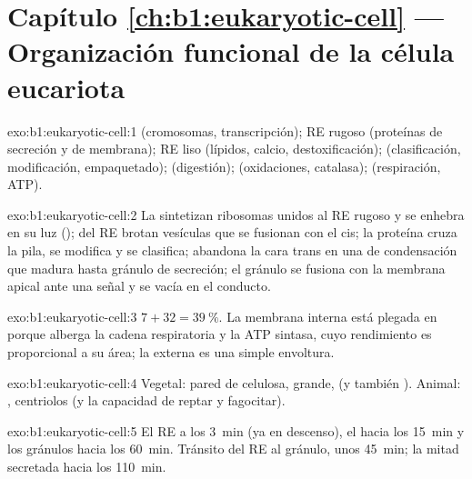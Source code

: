 \section*{Capítulo \ref{ch:b1:eukaryotic-cell} --- Organización funcional de la célula eucariota}

\begin{solution}{exo:b1:eukaryotic-cell:1}
 (cromosomas, transcripción); RE rugoso (proteínas de secreción y de
membrana); RE liso (lípidos, calcio, destoxificación);  (clasificación,
modificación, empaquetado);  (digestión);  (oxidaciones,
catalasa);  (respiración, ATP).
\end{solution}

\begin{solution}{exo:b1:eukaryotic-cell:2}
La sintetizan ribosomas unidos al RE rugoso y se enhebra en su luz
(); del RE brotan vesículas que se fusionan con el  cis;
la proteína cruza la pila, se modifica y se clasifica; abandona la cara
trans en una  de condensación que madura hasta gránulo de secreción;
el gránulo se fusiona con la membrana apical ante una señal y se vacía en el
conducto.
\end{solution}

\begin{solution}{exo:b1:eukaryotic-cell:3}
$7 + 32 = \qty{39}{\%}$. La membrana interna está plegada en  porque
alberga la cadena respiratoria y la ATP sintasa, cuyo rendimiento es
proporcional a su área; la externa es una simple envoltura.
\end{solution}

\begin{solution}{exo:b1:eukaryotic-cell:4}
Vegetal: pared de celulosa,  grande,  (y también
). Animal: , centriolos (y la capacidad de reptar y
fagocitar).
\end{solution}

\begin{solution}{exo:b1:eukaryotic-cell:5}
El RE a los \qty{3}{min} (ya en descenso), el  hacia los \qty{15}{min}
y los gránulos hacia los \qty{60}{min}. Tránsito del RE al gránulo, unos
\qty{45}{min}; la mitad secretada hacia los \qty{110}{min}.
\end{solution}

